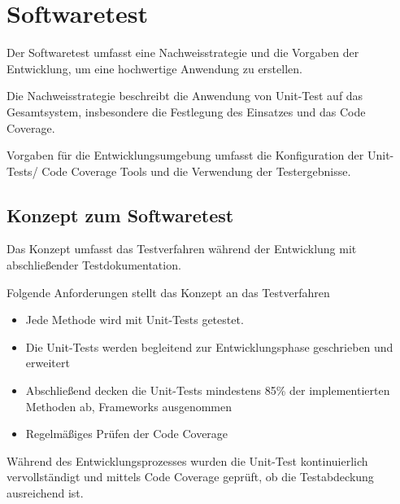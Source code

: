 \chapter{Softwaretest}\label{sec:Softwaretest}
Der Softwaretest umfasst eine Nachweisstrategie und die Vorgaben der Entwicklung, um eine hochwertige Anwendung zu erstellen.

Die Nachweisstrategie beschreibt die Anwendung von Unit-Test auf das Gesamtsystem, insbesondere die Festlegung des Einsatzes und das Code Coverage.

Vorgaben für die Entwicklungsumgebung umfasst die Konfiguration der Unit-Tests/ Code Coverage Tools und die Verwendung der Testergebnisse.

\section{Konzept zum Softwaretest}
Das Konzept umfasst das Testverfahren während der Entwicklung mit abschließender Testdokumentation.

Folgende Anforderungen stellt das Konzept an das Testverfahren
\begin{itemize}
\item	Jede Methode wird mit Unit-Tests getestet. 
\item	Die Unit-Tests werden begleitend zur Entwicklungsphase geschrieben und erweitert
\item	Abschließend decken die Unit-Tests mindestens 85\% der implementierten Methoden ab, Frameworks ausgenommen
\item 	Regelmäßiges Prüfen der Code Coverage
\end{itemize}

Während des Entwicklungsprozesses wurden die Unit-Test kontinuierlich vervollständigt und mittels Code Coverage geprüft, ob die Testabdeckung ausreichend ist.

